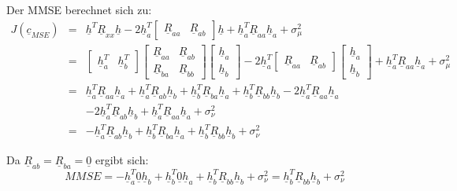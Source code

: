 Der MMSE berechnet sich zu:
\begin{eqnarray}
 J(\underline{c}_{MSE}) & = & \underline{h}^T \underline{R}_{xx} \underline{h} - 2 \underline{h}_a^T \begin{bmatrix} \underline{R}_{aa} & \underline{R}_{ab} \end{bmatrix} \underline{h} + \underline{h}_a^T \underline{R}_{aa} \underline{h}_a + \sigma_\mu^2 \\
 & = & \begin{bmatrix} \underline{h}_a^T & \underline{h}_b^T \end{bmatrix} \begin{bmatrix} \underline{R}_{aa} & \underline{R}_{ab} \\ \underline{R}_{ba} & \underline{R}_{bb} \end{bmatrix} \begin{bmatrix} \underline{h}_a \\ \underline{h}_b \end{bmatrix}  - 2 \underline{h}_a^T \begin{bmatrix} \underline{R}_{aa} & \underline{R}_{ab} \end{bmatrix} \begin{bmatrix} \underline{h}_a \\ \underline{h}_b \end{bmatrix} + \underline{h}_a^T \underline{R}_{aa} \underline{h}_a + \sigma_\mu^2 \\
 & = & \underline{h}_a^T \underline{R}_{aa} \underline{h}_a + \underline{h}_a^T \underline{R}_{ab} \underline{h}_b + \underline{h}_b^T \underline{R}_{ba} \underline{h}_a + \underline{h}_b^T \underline{R}_{bb} \underline{h}_b - 2 \underline{h}_a^T \underline{R}_{aa} \underline{h}_a \\
 & & - 2 \underline{h}_a^T \underline{R}_{ab} \underline{h}_b + \underline{h}_a^T \underline{R}_{aa} \underline{h}_a + \sigma_\nu^2 \\
 & = & - \underline{h}_a^T \underline{R}_{ab} \underline{h}_b + \underline{h}_b^T \underline{R}_{ba} \underline{h}_a + \underline{h}_b^T \underline{R}_{bb} \underline{h}_b + \sigma_\nu^2
\end{eqnarray}

Da $\underline{R}_{ab} = \underline{R}_{ba} = \underline{0}$ ergibt sich:
\begin{equation}
 MMSE = - \underline{h}_a^T \underline{0} \underline{h}_b + \underline{h}_b^T \underline{0} \underline{h}_a + \underline{h}_b^T \underline{R}_{bb} \underline{h}_b + \sigma_\nu^2 = \underline{h}_b^T \underline{R}_{bb} \underline{h}_b + \sigma_\nu^2
\end{equation}

